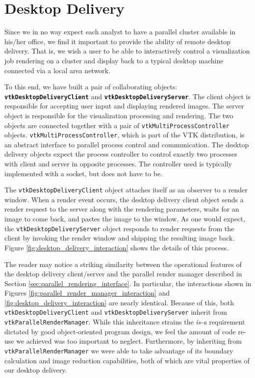 \documentclass{acmsiggraph}
\newcommand{\cidentifier}[1]{\texttt{#1}}
\newcommand{\keyterm}[1]{\textbf{#1}}
\begin{document}
  \section{Desktop Delivery}
  \label{sec:desktop_delivery}

  Since we in no way expect each analyst to have a parallel cluster
  available in his/her office, we find it important to provide the ability
  of remote desktop delivery.  That is, we wish a user to be able to
  interactively control a visualization job rendering on a cluster and
  display back to a typical desktop machine connected via a local area
  network.

  To this end, we have built a pair of collaborating objects:
  \keyterm{\cidentifier{vtk\-Desktop\-Delivery\-Client}} and
  \keyterm{\cidentifier{vtk\-Desktop\-Delivery\-Server}}.  The client
  object is responsible for accepting user input and displaying rendered
  images.  The server object is responsible for the visualization
  processing and rendering.  The two objects are connected together with a
  pair of \cidentifier{vtk\-Multi\-Process\-Controller} objects.
  \cidentifier{vtk\-Multi\-Process\-Controller}, which is part of the VTK
  distribution, is an abstract interface to parallel process control and
  communication.  The desktop delivery objects expect the process
  controller to control exactly two processes with client and server in
  opposite processes.  The controller used is typically implemented with a
  socket, but does not have to be.

  The \cidentifier{vtk\-Desktop\-Delivery\-Client} object attaches itself
  as an observer to a render window.  When a render event occurs, the
  desktop delivery client object sends a render request to the server along
  with the rendering parameters, waits for an image to come back, and
  pastes the image to the window.  As one would expect, the
  \cidentifier{vtk\-Desktop\-Delivery\-Server} object responds to render
  requests from the client by invoking the render window and shipping the
  resulting image back.  Figure \ref{fig:desktop_delivery_interaction}
  shows the details of this process.

  The reader may notice a striking similarity between the operational
  features of the desktop delivery client/server and the parallel render
  manager described in Section \ref{sec:parallel_rendering_interface}.  In
  particular, the interactions shown in Figures
  \ref{fig:parallel_render_manager_interaction} and
  \ref{fig:desktop_delivery_interaction} are nearly identical.  Because of
  this, both \cidentifier{vtk\-Desktop\-Delivery\-Client} and
  \cidentifier{vtk\-Desktop\-Delivery\-Server} inherit from
  \cidentifier{vtk\-Parallel\-Render\-Manager}.  While this inheritance
  strains the \emph{is-a} requirement dictated by good object-oriented program
  design, we feel the amount of code re-use we achieved was too important
  to neglect.  Furthermore, by inheriting from
  \cidentifier{vtk\-Parallel\-Render\-Manager} we were able to take
  advantage of its boundary calculation and image reduction capabilities,
  both of which are vital properties of our desktop delivery.
\end{document}
